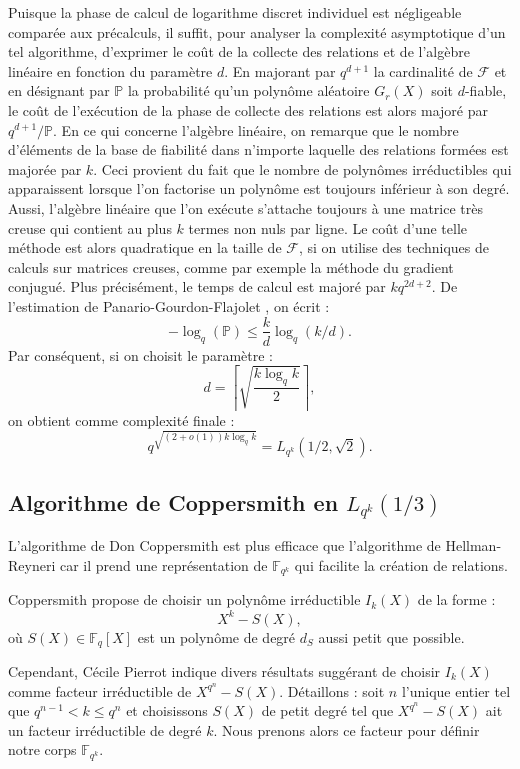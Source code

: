 \documentclass[a4paper, titlepage, 11pt]{article}
\theoremstyle{definition}
\theoremstyle{remark}
\def\o{o}
\def\gf #1{\mathbb{F}_{#1}}
\begin{document}
Puisque la phase de calcul de logarithme discret individuel est négligeable comparée aux précalculs, il suffit, pour analyser la complexité asymptotique d'un tel algorithme, d'exprimer le coût de la collecte des relations et de l'algèbre linéaire en fonction du paramètre $d$. En majorant par $q^{d+1}$ la cardinalité de $\mathcal{F}$ et en désignant par $\mathbb{P}$ la probabilité qu'un polynôme aléatoire $G_r(X)$ soit $d$-fiable, le coût de l'exécution de la phase de collecte des relations est alors majoré par $q^{d+1}/\mathbb{P}$. En ce qui concerne l'algèbre linéaire, on remarque que le nombre d'éléments de la base de fiabilité dans n'importe laquelle des relations formées est majorée par $k$. Ceci provient du fait que le nombre de polynômes irréductibles qui apparaissent lorsque l'on factorise un polynôme est toujours inférieur à son degré. Aussi, l’algèbre linéaire que l'on exécute s'attache toujours à une matrice très creuse qui contient au plus $k$ termes non nuls par ligne. Le coût d'une telle méthode est alors quadratique en la taille de $\mathcal{F}$, si on utilise des techniques de calculs sur matrices creuses, comme par exemple la méthode du gradient conjugué. Plus précisément, le temps de calcul est majoré par $kq^{2d+2}$. De l'estimation de Panario-Gourdon-Flajolet \cite{PGF98}, on écrit :
$$-\log_q(\mathbb{P}) \leqslant\frac{k}{d}\log_q(k/d).$$
Par conséquent, si on choisit le paramètre :
$$d = \left\lceil \sqrt{ \frac{k\log_q k}{2} } \right\rceil,$$
on obtient comme complexité finale :
$$q^{\sqrt{(2+\o(1))k\log_qk}} = L_{q^k}(1/2,\sqrt 2).$$

\subsection{Algorithme de Coppersmith en $L_{q^k}(1/3)$}

L'algorithme de Don Coppersmith \cite{coppersmith1984} est plus efficace que l'algorithme de Hellman-Reyneri car il prend une représentation de $\gf{q^k}$ qui facilite la création de relations.

Coppersmith propose de choisir un polynôme irréductible $I_k(X)$ de la forme : $$X^k - S(X),$$ où $S(X) \in \gf{q}[X]$ est un polynôme de degré $d_S$ aussi petit que possible.

Cependant, Cécile Pierrot \cite{pierrot2016} indique divers résultats \cite{joux2006, joux2013} suggérant de choisir $I_k(X)$ comme facteur irréductible de $X^{q^n}-S(X)$. Détaillons : soit $n$ l'unique entier tel que $q^{n-1} < k \leqslant q^n$ et choisissons $S(X)$ de petit degré tel que $X^{q^n}-S(X)$ ait un facteur irréductible de degré $k$. Nous prenons alors ce facteur pour définir notre corps $\gf{q^k}$.
\end{document}
